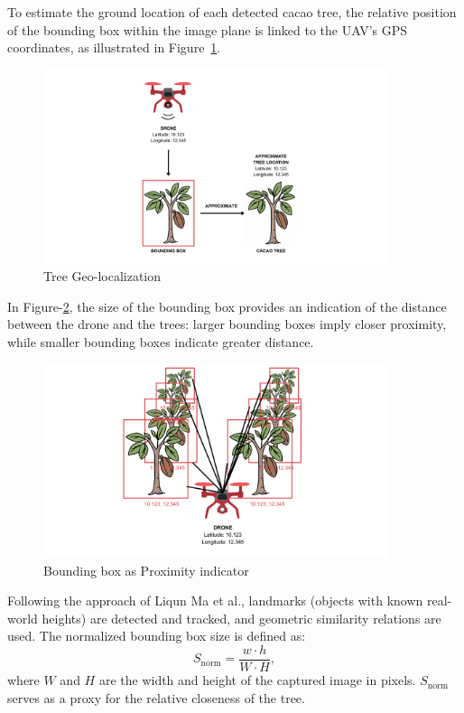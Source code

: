 To estimate the ground location of each detected cacao tree, the relative position of the bounding box within the image plane is linked to the UAV’s GPS coordinates, as illustrated in Figure~\ref{fig:tree}.

\begin{figure}[H]
	\centering
	\caption{Tree Geo-localization}
	\label{fig:tree}
	\includegraphics[width=0.9\textwidth]{figures/Tree Geolocalization.pdf}
\end{figure}

In Figure-\ref{fig:treex}, the size of the bounding box provides an indication of the distance between the drone and the trees: larger bounding boxes imply closer proximity, while smaller bounding boxes indicate greater distance.

\begin{figure}[H]
	\centering
	\caption{Bounding box as Proximity indicator}
	\label{fig:treex}
	\includegraphics[width=0.9\textwidth]{figures/Bounding box as a Proximity Indicator.pdf}
\end{figure}

Following the approach of Liqun Ma et al., landmarks (objects with known real-world heights) are detected and tracked, and geometric similarity relations are used. The normalized bounding box size is defined as:
\begin{equation}
	S_\text{norm} = \frac{w \cdot h}{W \cdot H},
\end{equation}
where $W$ and $H$ are the width and height of the captured image in pixels. $S_\text{norm}$ serves as a proxy for the relative closeness of the tree.

